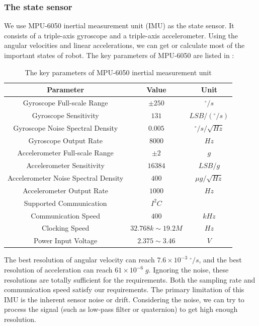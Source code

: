 \documentclass[9pt,a4paper,twocolumn]{tau-class/tau}
\begin{document}
\subsubsection{The state sensor}
We use MPU-6050 inertial measurement unit (IMU) as the state sensor. It consists of a triple-axis gyroscope and a triple-axis accelerometer. Using the angular velocities and linear accelerations, we can get or calculate most of the important states of robot. The key parameters of MPU-6050 are listed in :

\begin{table}[htbp]
    \centering
    \begin{tabular}{c c c}
    \toprule
    \textbf{Parameter} & \textbf{Value} & \textbf{Unit} \\
    \midrule
    Gyroscope Full-scale Range & $\pm250$ & $^\circ/s$\\
    Gyroscope Sensitivity & $131$ & $LSB/(^\circ/s)$\\
    Gyroscope Noise Spectral Density & $0.005$ & $^\circ/s/\sqrt{Hz}$\\
    Gyroscope Output Rate & $8000$ & $Hz$\\
    \midrule
    Accelerometer Full-scale Range & $\pm2$ & $g$\\
    Accelerometer Sensitivity & $16384$ & $LSB/g$\\
    Accelerometer Noise Spectral Density & $400$ & $\mu g/\sqrt{Hz}$\\
    Accelerometer Output Rate & $1000$ & $Hz$\\
    \midrule
    Supported Communication & $I^2C$ & \\
    Communication Speed & $400$ & $kHz$ \\
    Clocking Speed & $32.768k\sim19.2M$ & $Hz$ \\
    \midrule
    Power Input Voltage & $2.375\sim3.46$ & $V$ \\
    \bottomrule
    \end{tabular}
    \vspace{\baselineskip}
    \caption{The key parameters of MPU-6050 inertial measurement unit \cite{mpu6050_datasheet}}
    \label{tab:mpu6050_specifications}
\end{table}

The best resolution of angular velocity can reach $7.6\times10^{-3}\;^\circ/s$, and the best resolution of acceleration can reach $61\times10^{-6}\;g$. Ignoring the noise, these resolutions are totally sufficient for the requirements. Both the sampling rate and communication speed satisfy our requirements. The primary limitation of this IMU is the inherent sensor noise or drift. Considering the noise, we can try to process the signal (such as low-pass filter or quaternion) to get high enough resolution. 
\end{document}

